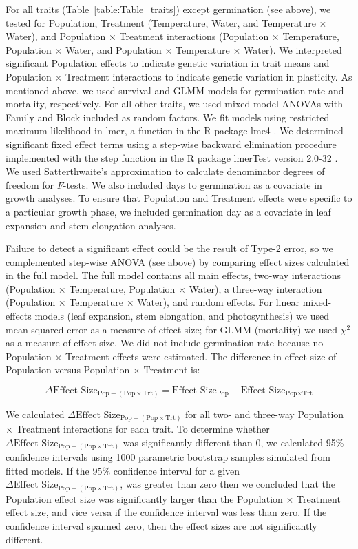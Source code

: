 \documentclass[11pt, oneside]{article}
\newcommand{\pkg}[1]{{\fontseries{b}\selectfont #1}}
\begin{document}
For all traits (Table~\ref{table:Table_traits}) except germination (see above), we tested for Population, Treatment (Temperature, Water, and Temperature $\times$ Water), and Population $\times$ Treatment interactions (Population $\times$ Temperature, Population $\times$ Water, and Population $\times$ Temperature $\times$ Water). We interpreted significant Population effects to indicate genetic variation in trait means and Population $\times$ Treatment interactions to indicate genetic variation in plasticity. As mentioned above, we used survival and GLMM models for germination rate and mortality, respectively. For all other traits, we used mixed model ANOVAs with Family and Block included as random factors. We fit models using restricted maximum likelihood in lmer, a function in the R package \pkg{lme4} \citep{Bates_etal_2015}. We determined significant fixed effect terms using a step-wise backward elimination procedure implemented with the step function in the R package \pkg{lmerTest} version 2.0-32 \citep{Kuznetsova_etal_2016}. We used Satterthwaite's approximation to calculate denominator degrees of freedom for $F$-tests. We also included days to germination as a covariate in growth analyses. To ensure that Population and Treatment effects were specific to a particular growth phase, we included germination day as a covariate in leaf expansion and stem elongation analyses.

Failure to detect a significant effect could be the result of Type-2 error, so we complemented step-wise ANOVA (see above) by comparing effect sizes calculated in the full model. The full model contains all main effects, two-way interactions (Population $\times$ Temperature, Population $\times$ Water), a three-way interaction (Population $\times$ Temperature $\times$ Water), and random effects. For linear mixed-effects models (leaf expansion, stem elongation, and photosynthesis) we used mean-squared error as a measure of effect size; for GLMM (mortality) we used $\chi^2$ as a measure of effect size. We did not include germination rate because no Population $\times$ Treatment effects were estimated. The difference in effect size of Population versus Population $\times$ Treatment is:

$$ \Delta \textrm{Effect Size}_{\textrm{Pop} - (\textrm{Pop} \times \textrm{Trt})} = \textrm{Effect Size}_\textrm{Pop} - \textrm{Effect Size}_{\textrm{Pop} \times \textrm{Trt}} $$

We calculated $\Delta \textrm{Effect Size}_{\textrm{Pop} - (\textrm{Pop} \times \textrm{Trt})}$ for all two- and three-way Population $\times$ Treatment interactions for each trait. To determine whether $\Delta \textrm{Effect Size}_{\textrm{Pop} - (\textrm{Pop} \times \textrm{Trt})}$ was significantly different than 0, we calculated 95\% confidence intervals using 1000 parametric bootstrap samples simulated from fitted models. If the 95\% confidence interval for a given $\Delta \textrm{Effect Size}_{\textrm{Pop} - (\textrm{Pop} \times \textrm{Trt})}$, was greater than zero then we concluded that the Population effect size was significantly larger than the Population $\times$ Treatment effect size, and vice versa if the confidence interval was less than zero. If the confidence interval spanned zero, then the effect sizes are not significantly different.
\end{document}
